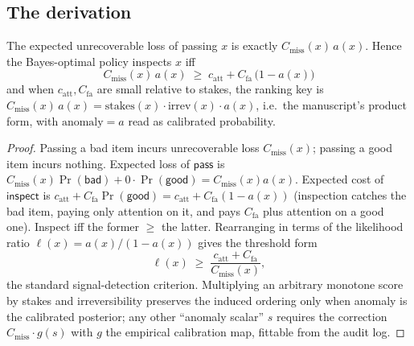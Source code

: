 \documentclass[11pt,a4paper]{article}
\begin{document}
\subsection{The derivation}
\begin{theorem}
The expected unrecoverable loss of passing $x$ is exactly $C_\text{miss}(x)\,a(x)$. Hence the Bayes-optimal policy inspects $x$ iff
\[
\boxed{\;C_\text{miss}(x)\,a(x) \;\ge\; c_\text{att} + C_\text{fa}\,\bigl(1-a(x)\bigr)\;}
\]
and when $c_\text{att}, C_\text{fa}$ are small relative to stakes, the ranking key is $C_\text{miss}(x)\,a(x) = \text{stakes}(x)\cdot\text{irrev}(x)\cdot a(x)$, i.e.\ the manuscript's product form, with $\mathrm{anomaly}=a$ read as calibrated probability.
\end{theorem}
\begin{proof}
Passing a bad item incurs unrecoverable loss $C_\text{miss}(x)$; passing a good item incurs nothing. Expected loss of $\mathsf{pass}$ is $C_\text{miss}(x)\Pr(\mathsf{bad}) + 0\cdot\Pr(\mathsf{good}) = C_\text{miss}(x)a(x)$. Expected cost of $\mathsf{inspect}$ is $c_\text{att} + C_\text{fa}\Pr(\mathsf{good}) = c_\text{att}+C_\text{fa}(1-a(x))$ (inspection catches the bad item, paying only attention on it, and pays $C_\text{fa}$ plus attention on a good one). Inspect iff the former $\ge$ the latter. Rearranging in terms of the likelihood ratio $\ell(x)=a(x)/(1-a(x))$ gives the threshold form
\[
\ell(x) \;\ge\; \frac{c_\text{att}+C_\text{fa}}{C_\text{miss}(x)},
\]
the standard signal-detection criterion. Multiplying an arbitrary monotone score by stakes and irreversibility preserves the induced ordering only when anomaly is the calibrated posterior; any other ``anomaly scalar'' $s$ requires the correction $C_\text{miss}\cdot g(s)$ with $g$ the empirical calibration map, fittable from the audit log.
\end{proof}
\end{document}
